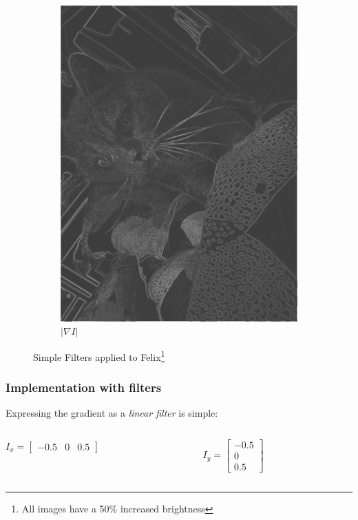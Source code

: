 \begin{frame}
\begin{figure}
\begin{subfigure}[b]{0.175\textwidth}
			\includegraphics[width=\textwidth]{images/KadseSimple}
			\caption[]%
			{{\small $|\nabla I |$}}    
			\label{fig:FelixSimple}
		\end{subfigure}
		\caption[Simple Filters applied to Felix ]
		{\small Simple Filters applied to Felix\footnote{All images have a 50\% increased brightness}} 
		\label{fig:FullSimpleFelix}
	\end{figure}
	
	
\end{frame}
\begin{frame}
	\frametitle{Implementation with filters}
	\label{SimpleFilters}
	Expressing the gradient as a \textit{linear filter} is simple:
	\begin{columns}
		\begin{column}{0.5\textwidth}
			\begin{center}
				$I_x = \begin{bmatrix} -0.5 & 0 & 0.5\end{bmatrix}$
			\end{center}	
		\end{column}
		\begin{column}{0.5\textwidth} 
			\begin{center}
				$I_y = \begin{bmatrix} -0.5 \\ 0 \\ 0.5\end{bmatrix}$
			\end{center}
		\end{column}
	\end{columns}
\end{frame}
